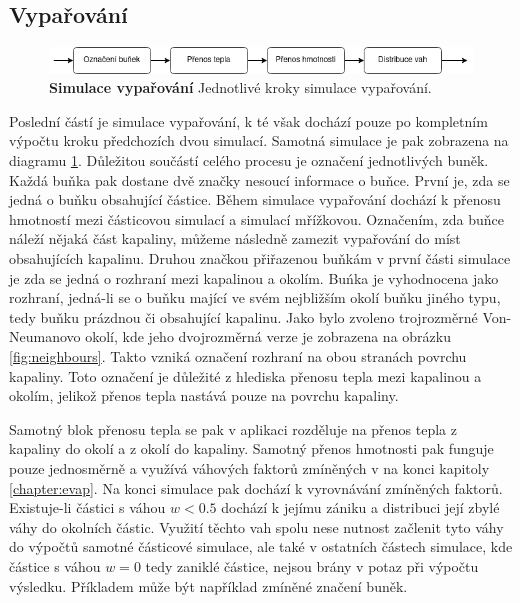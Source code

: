 \subsection{Vypařování}
\label{chapter:simEvap}

\begin{figure}[hbt]
	\centering
	\captionsetup{justification=centering}
	\includegraphics[scale=0.6]{obrazky-figures/EvapFlow.png}
	\caption{\textbf{Simulace vypařování} Jednotlivé kroky simulace vypařování.}
	\label{fig:EvapFlow}
\end{figure}

Poslední částí je simulace vypařování, k té však dochází pouze po kompletním výpočtu kroku předchozích dvou simulací. Samotná simulace je pak zobrazena na diagramu \ref{fig:EvapFlow}. Důležitou součástí celého procesu je označení jednotlivých buněk. Každá buňka pak dostane dvě značky nesoucí informace o buňce. První je, zda se jedná o buňku obsahující částice. Během simulace vypařování dochází k přenosu hmotností mezi částicovou simulací a simulací mřížkovou. Označením, zda buňce náleží nějaká část kapaliny, můžeme následně zamezit vypařování do míst obsahujících kapalinu. Druhou značkou přiřazenou buňkám v první části simulace je zda se jedná o rozhraní mezi kapalinou a okolím. Buńka je vyhodnocena jako rozhraní, jedná-li se o buňku mající ve svém nejbližším okolí buňku jiného typu, tedy buňku prázdnou či obsahující kapalinu. Jako bylo zvoleno trojrozměrné Von-Neumanovo okolí, kde jeho dvojrozměrná verze je zobrazena na obrázku \ref{fig:neighbours}. Takto vzniká označení rozhraní na obou stranách povrchu kapaliny. Toto označení je důležité z hlediska přenosu tepla mezi kapalinou a okolím, jelikož přenos tepla nastává pouze na povrchu kapaliny. 

Samotný blok přenosu tepla se pak v aplikaci rozděluje na přenos tepla z kapaliny do okolí a z okolí do kapaliny. Samotný přenos hmotnosti pak funguje pouze jednosměrně a využívá váhových faktorů zmíněných v na konci kapitoly \ref{chapter:evap}. Na konci simulace pak dochází k vyrovnávání zmíněných faktorů. Existuje-li částici s váhou $w < 0.5$ dochází k jejímu zániku a distribuci její zbylé váhy do okolních částic. Využití těchto vah spolu nese nutnost začlenit tyto váhy do výpočtů samotné částicové simulace, ale také v ostatních částech simulace, kde částice s váhou $w = 0$ tedy zaniklé částice, nejsou brány v potaz při výpočtu výsledku. Příkladem může být například zmíněné značení buněk.

